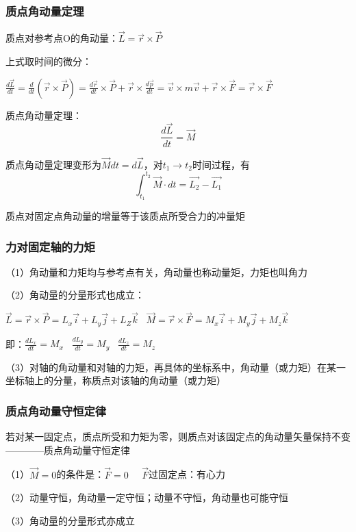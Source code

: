 \documentclass[UTF8]{article}
\begin{document}
\subsubsection{质点角动量定理}

    质点对参考点O的角动量：$\vec{L} = \vec{r}\times\vec{P}$

    上式取时间的微分：
    
    $\frac{d\vec{L}}{dt} = \frac{d}{dt}(\vec{r}\times\vec{P}) = \frac{d\vec{r}}{dt}\times\vec{P} + \vec{r}\times\frac{d\vec{p}}{dt} = \vec{v}\times m\vec{v} + \vec{r}\times\vec{F} = \vec{r}\times\vec{F}$

    质点角动量定理：\[\frac{d\vec{L}}{dt} = \vec{M}\]

    质点角动量定理变形为$\vec{M}dt = d\vec{L}$，对$t_1\rightarrow t_2$时间过程，有
    \[\int_{t_1}^{t_2}\vec{M}\cdot dt = \vec{L_2} - \vec{L_1}\]

    质点对固定点角动量的增量等于该质点所受合力的冲量矩

\subsubsection{力对固定轴的力矩}

    （1）角动量和力矩均与参考点有关，角动量也称动量矩，力矩也叫角力

    （2）角动量的分量形式也成立：
    
    $\vec{L} = \vec{r}\times\vec{P} = L_x\vec{i} + L_y\vec{j} + L_Z\vec{k}\;\;\;\vec{M} = \vec{r}\times\vec{F} = M_x\vec{i} + M_y\vec{j} + M_z\vec{k}$

    即：$\frac{dL_x}{dt} = M_x\;\;\;\frac{dL_y}{dt} = M_y\;\;\;\frac{dL_z}{dt} = M_z$

    （3）对轴的角动量和对轴的力矩，再具体的坐标系中，角动量（或力矩）在某一坐标轴上的分量，称质点对该轴的角动量（或力矩）

\subsubsection{质点角动量守恒定律}

    若对某一固定点，质点所受和力矩为零，则质点对该固定点的角动量矢量保持不变————质点角动量守恒定律

    （1）$\vec{M} = 0$的条件是：$\vec{F} = 0\;\;\;\;\;\vec{F}$过固定点：有心力

    （2）动量守恒，角动量一定守恒；动量不守恒，角动量也可能守恒

    （3）角动量的分量形式亦成立
\end{document}
